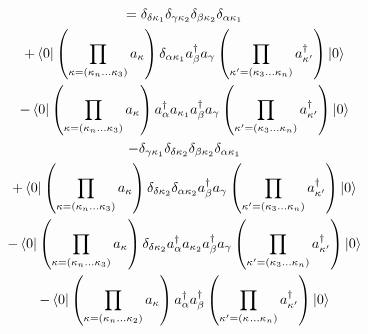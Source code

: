 \documentclass[12pt]{article}
\begin{document}
\begin{multline}
    =
        \delta_{\delta\kappa_{1}}\delta_{\gamma\kappa_{2}}\delta_{\beta\kappa_{2}}\delta_{\alpha\kappa_{1}}\\
        +\bra{0}\left(\prod_{\kappa=\left(\kappa_{n}\dots\kappa_{3}\right)}a_{\kappa}\right)
            \delta_{\alpha\kappa_{1}}a^{\dag}_{\beta}a_{\gamma}
        \left(\prod_{\kappa^{\prime}=\left(\kappa_{3}\dots\kappa_{n}\right)}a^{\dag}_{\kappa^{\prime}}\right)\ket{0}\\
        -\bra{0}\left(\prod_{\kappa=\left(\kappa_{n}\dots\kappa_{3}\right)}a_{\kappa}\right)
            a^{\dag}_{\alpha}a_{\kappa_{1}}a^{\dag}_{\beta}a_{\gamma}
        \left(\prod_{\kappa^{\prime}=\left(\kappa_{3}\dots\kappa_{n}\right)}a^{\dag}_{\kappa^{\prime}}\right)\ket{0}\\
        -\delta_{\gamma\kappa_{1}}\delta_{\delta\kappa_{2}}\delta_{\beta\kappa_{2}}\delta_{\alpha\kappa_{1}}\\
        +\bra{0}\left(\prod_{\kappa=\left(\kappa_{n}\dots\kappa_{3}\right)}a_{\kappa}\right)
            \delta_{\delta\kappa_{2}}\delta_{\alpha\kappa_{2}}a^{\dag}_{\beta}a_{\gamma}
        \left(\prod_{\kappa^{\prime}=\left(\kappa_{3}\dots\kappa_{n}\right)}a^{\dag}_{\kappa^{\prime}}\right)\ket{0}\\
        -\bra{0}\left(\prod_{\kappa=\left(\kappa_{n}\dots\kappa_{3}\right)}a_{\kappa}\right)
            \delta_{\delta\kappa_{2}}a^{\dag}_{\alpha}a_{\kappa_{2}}a^{\dag}_{\beta}a_{\gamma}
        \left(\prod_{\kappa^{\prime}=\left(\kappa_{3}\dots\kappa_{n}\right)}a^{\dag}_{\kappa^{\prime}}\right)\ket{0}\\
        -\bra{0}\left(\prod_{\kappa=\left(\kappa_{n}\dots\kappa_{2}\right)}a_{\kappa}\right)
            a^{\dag}_{\alpha}a^{\dag}_{\beta}
        \left(\prod_{\kappa^{\prime}=\left(\kappa_{}\dots\kappa_{n}\right)}a^{\dag}_{\kappa^{\prime}}\right)\ket{0}
\end{multline}
\end{document}
